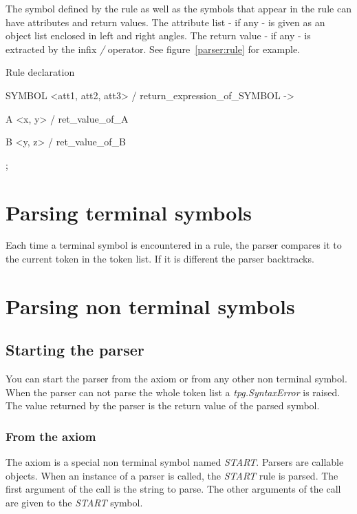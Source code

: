 The symbol defined by the rule as well as the symbols that appear in the rule can have attributes and return values.
The attribute list - if any - is given as an object list enclosed in left and right angles.
The return value - if any - is extracted by the infix \emph{/} operator.
See figure~\ref{parser:rule} for example.

\begin{code}
\caption{Rule declaration}										\label{parser:rule}
\begin{verbatimtab}[4]
	SYMBOL <att1, att2, att3> / return_expression_of_SYMBOL ->

		A <x, y> / ret_value_of_A

		B <y, z> / ret_value_of_B

		;
\end{verbatimtab}
\end{code}

\section{Parsing terminal symbols}

Each time a terminal symbol is encountered in a rule, the parser compares it to the current token in the token list. If it is different the parser backtracks.

\section{Parsing non terminal symbols}							\label{parser:nterm}

\subsection{Starting the parser}

You can start the parser from the axiom or from any other non terminal symbol.
When the parser can not parse the whole token list a \emph{tpg.SyntaxError} is raised.
The value returned by the parser is the return value of the parsed symbol.

\subsubsection{From the axiom}

The axiom is a special non terminal symbol named \emph{START}.
Parsers are callable objects.
When an instance of a parser is called, the \emph{START} rule is parsed.
The first argument of the call is the string to parse.
The other arguments of the call are given to the \emph{START} symbol.

